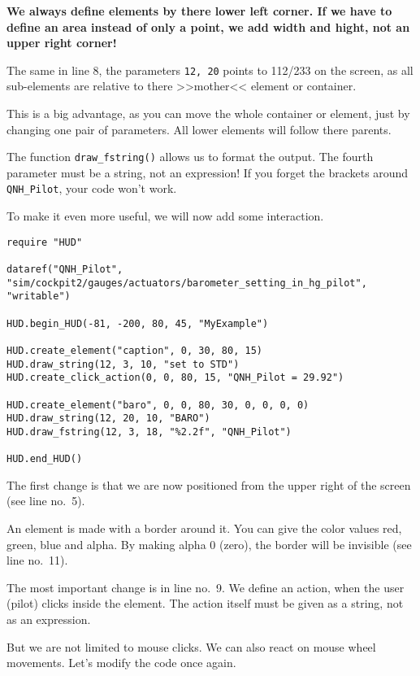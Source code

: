 \documentclass[11pt,parskip=half,a4paper]{scrartcl}
\begin{document}
\textbf{We always define elements by there lower left corner. If we have to define an area instead of only a point, we add width and hight, not an upper right corner!}

The same in line 8, the parameters \verb|12, 20| points to 112/233 on the screen, as all sub-elements are relative to there >>mother<< element or container.

This is a big advantage, as you can move the whole container or element, just by changing one pair of parameters. All lower elements will follow there parents.

The function \verb|draw_fstring()| allows us to format the output. The fourth parameter must be a string, not an expression! If you forget the brackets around \verb|QNH_Pilot|, your code won't work.

To make it even more useful, we will now add some interaction.

\begin{lstlisting}[firstnumber=1]
require "HUD"

dataref("QNH_Pilot", "sim/cockpit2/gauges/actuators/barometer_setting_in_hg_pilot", "writable")

HUD.begin_HUD(-81, -200, 80, 45, "MyExample")

HUD.create_element("caption", 0, 30, 80, 15)
HUD.draw_string(12, 3, 10, "set to STD")
HUD.create_click_action(0, 0, 80, 15, "QNH_Pilot = 29.92")

HUD.create_element("baro", 0, 0, 80, 30, 0, 0, 0, 0)
HUD.draw_string(12, 20, 10, "BARO")
HUD.draw_fstring(12, 3, 18, "%2.2f", "QNH_Pilot")

HUD.end_HUD()
\end{lstlisting}

The first change is that we are now positioned from the upper right of the screen (see line no.~5).

An element is made with a border around it. You can give the color values red, green, blue and alpha. By making alpha 0 (zero), the border will be invisible (see line no.~11).

The most important change is in line no.~9. We define an action, when the user (pilot) clicks inside the element. The action itself must be given as a string, not as an expression.

But we are not limited to mouse clicks. We can also react on mouse wheel movements. Let's modify the code once again.
\end{document}
